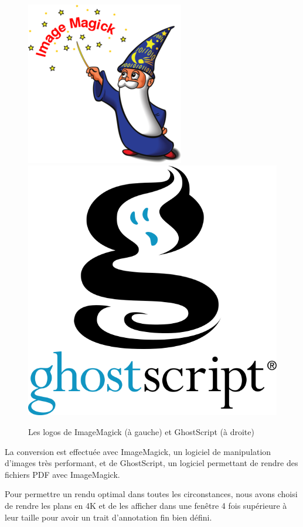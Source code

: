\begin{figure}[h]
    \centering
    \includegraphics[scale=0.3]{img/image-magick.png}
    \hspace{5cm}
    \includegraphics[scale=0.13]{img/ghostscript.png}
    \caption{Les logos de ImageMagick (à gauche) et GhostScript (à droite)}
\end{figure}

La conversion est effectuée avec ImageMagick, un logiciel de manipulation d'images très performant, et de GhostScript, un logiciel permettant de rendre des fichiers PDF avec ImageMagick.

Pour permettre un rendu optimal dans toutes les circonstances, nous avons choisi de rendre les plans en 4K et de les afficher dans une fenêtre 4 fois supérieure à leur taille pour avoir un trait d'annotation fin bien défini.

